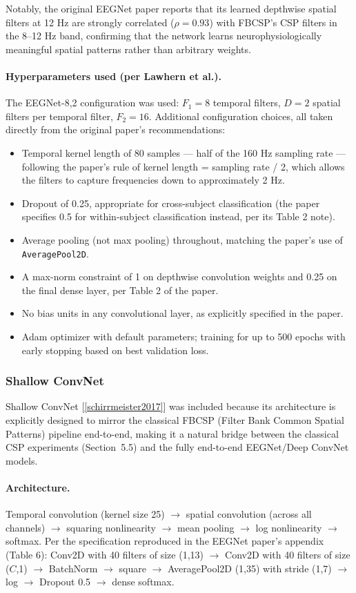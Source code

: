 \documentclass[11pt,a4paper]{article}
\newcommand{\code}[1]{\texttt{#1}}
\renewcommand{\cite}[1]{[\ref{#1}]}
\begin{document}
Notably, the original EEGNet paper reports that its learned depthwise spatial filters at 12 Hz are strongly correlated ($\rho=0.93$) with FBCSP's CSP filters in the 8--12 Hz band, confirming that the network learns neurophysiologically meaningful spatial patterns rather than arbitrary weights.

\paragraph{Hyperparameters used (per Lawhern et al.).} The EEGNet-8,2 configuration was used: $F_1=8$ temporal filters, $D=2$ spatial filters per temporal filter, $F_2=16$. Additional configuration choices, all taken directly from the original paper's recommendations:
\begin{itemize}[leftmargin=1.5em]
    \item Temporal kernel length of 80 samples --- half of the 160 Hz sampling rate --- following the paper's rule of kernel length = sampling rate / 2, which allows the filters to capture frequencies down to approximately 2 Hz.
    \item Dropout of 0.25, appropriate for cross-subject classification (the paper specifies 0.5 for within-subject classification instead, per its Table 2 note).
    \item Average pooling (not max pooling) throughout, matching the paper's use of \code{AveragePool2D}.
    \item A max-norm constraint of 1 on depthwise convolution weights and 0.25 on the final dense layer, per Table 2 of the paper.
    \item No bias units in any convolutional layer, as explicitly specified in the paper.
    \item Adam optimizer with default parameters; training for up to 500 epochs with early stopping based on best validation loss.
\end{itemize}

\subsubsection{Shallow ConvNet}
Shallow ConvNet \cite{schirrmeister2017} was included because its architecture is explicitly designed to mirror the classical FBCSP (Filter Bank Common Spatial Patterns) pipeline end-to-end, making it a natural bridge between the classical CSP experiments (Section~5.5) and the fully end-to-end EEGNet/Deep ConvNet models.

\paragraph{Architecture.} Temporal convolution (kernel size 25) $\rightarrow$ spatial convolution (across all channels) $\rightarrow$ squaring nonlinearity $\rightarrow$ mean pooling $\rightarrow$ log nonlinearity $\rightarrow$ softmax. Per the specification reproduced in the EEGNet paper's appendix (Table 6): Conv2D with 40 filters of size (1,13) $\rightarrow$ Conv2D with 40 filters of size ($C$,1) $\rightarrow$ BatchNorm $\rightarrow$ square $\rightarrow$ AveragePool2D (1,35) with stride (1,7) $\rightarrow$ log $\rightarrow$ Dropout 0.5 $\rightarrow$ dense softmax.
\end{document}

